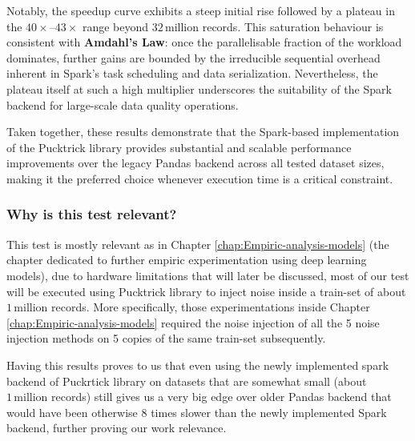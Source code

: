 \documentclass[../main.tex]{subfiles}
\begin{document}
Notably, the speedup curve exhibits a steep initial rise followed by a plateau in the $40\times$–$43\times$ range beyond $32\,\text{million}$ records. This saturation behaviour is consistent with \textbf{Amdahl's Law}: once the parallelisable fraction of the workload dominates, further gains are bounded by the irreducible sequential overhead inherent in Spark's task scheduling and data serialization. Nevertheless, the plateau itself at such a high multiplier underscores the suitability of the Spark backend for large-scale data quality operations.

Taken together, these results demonstrate that the Spark-based implementation of the Pucktrick library provides substantial and scalable performance improvements over the legacy Pandas backend across all tested dataset sizes, making it the preferred choice whenever execution time is a critical constraint.


\subsubsection{Why is this test relevant?}
This test is mostly relevant as in Chapter \ref{chap:Empiric-analysis-models} (the chapter dedicated to further empiric experimentation using deep learning models), due to hardware limitations that will later be discussed, most of our test will be executed using Pucktrick library to inject noise inside a train-set of about $1\,\text{million}$ records. More specifically, those experimentations inside Chapter \ref{chap:Empiric-analysis-models} required the noise injection of all the 5 noise injection methods on 5 copies of the same train-set subsequently.

Having this results proves to us that even using the newly implemented spark backend of Puckrtick library on datasets that are somewhat small (about $1\,\text{million}$ records) still gives us a very big edge over older Pandas backend that would have been otherwise 8 times slower than the newly implemented Spark backend, further proving our work relevance.


\end{document}
